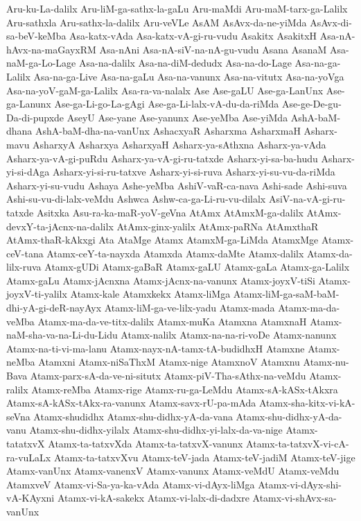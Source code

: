 {Aru-ku-La-dalilx
Aru-liM-ga-sathx-la-gaLu
Aru-maMdi
Aru-maM-tarx-ga-Lalilx
Aru-sathxla
Aru-sathx-la-dalilx
Aru-veVLe
AsAM
AsAvx-da-ne-yiMda
AsAvx-di-sa-beV-keMba
Asa-katx-vAda
Asa-katx-vA-gi-ru-vudu
Asakitx
AsakitxH
Asa-nA-hAvx-na-maGayxRM
Asa-nAni
Asa-nA-siV-na-nA-gu-vudu
Asana
AsanaM
Asa-naM-ga-Lo-Lage
Asa-na-dalilx
Asa-na-diM-dedudx
Asa-na-do-Lage
Asa-na-ga-Lalilx
Asa-na-ga-Live
Asa-na-gaLu
Asa-na-vanunx
Asa-na-vitutx
Asa-na-yoVga
Asa-na-yoV-gaM-ga-Lalilx
Asa-ra-va-nalalx
Ase
Ase-gaLU
Ase-ga-LanUnx
Ase-ga-Lanunx
Ase-ga-Li-go-La-gAgi
Ase-ga-Li-lalx-vA-du-da-riMda
Ase-ge-De-gu-Da-di-pupxde
AseyU
Ase-yane
Ase-yanunx
Ase-yeMba
Ase-yiMda
AshA-baM-dhana
AshA-baM-dha-na-vanUnx
AshacxyaR
Asharxma
AsharxmaH
Asharx-mavu
AsharxyA
Asharxya
AsharxyaH
Asharx-ya-sAthxna
Asharx-ya-vAda
Asharx-ya-vA-gi-puRdu
Asharx-ya-vA-gi-ru-tatxde
Asharx-yi-sa-ba-hudu
Asharx-yi-si-dAga
Asharx-yi-si-ru-tatxve
Asharx-yi-si-ruva
Asharx-yi-su-vu-da-riMda
Asharx-yi-su-vudu
Ashaya
Ashe-yeMba
AshiV-vaR-ca-nava
Ashi-sade
Ashi-suva
Ashi-su-vu-di-lalx-veMdu
Ashwca
Ashw-ca-ga-Li-ru-vu-dilalx
AsiV-na-vA-gi-ru-tatxde
Asitxka
Asu-ra-ka-maR-yoV-geVna
AtAmx
AtAmxM-ga-dalilx
AtAmx-devxY-ta-jAcnx-na-dalilx
AtAmx-ginx-yalilx
AtAmx-paRNa
AtAmxthaR
AtAmx-thaR-kAkxgi
Ata
AtaMge
Atamx
AtamxM-ga-LiMda
AtamxMge
Atamx-ceV-tana
Atamx-ceY-ta-nayxda
Atamxda
Atamx-daMte
Atamx-dalilx
Atamx-da-lilx-ruva
Atamx-gUDi
Atamx-gaBaR
Atamx-gaLU
Atamx-gaLa
Atamx-ga-Lalilx
Atamx-gaLu
Atamx-jAcnxna
Atamx-jAcnx-na-vanunx
Atamx-joyxV-tiSi
Atamx-joyxV-ti-yalilx
Atamx-kale
Atamxkekx
Atamx-liMga
Atamx-liM-ga-saM-baM-dhi-yA-gi-deR-nayAyx
Atamx-liM-ga-ve-lilx-yadu
Atamx-mada
Atamx-ma-da-veMba
Atamx-ma-da-ve-titx-dalilx
Atamx-muKa
Atamxna
AtamxnaH
Atamx-naM-sha-va-na-Li-du-Lidu
Atamx-nalilx
Atamx-na-na-ri-voDe
Atamx-nanunx
Atamx-na-ti-vi-ma-lanu
Atamx-nayx-nA-tamx-tA-budidhxH
Atamxne
Atamx-neMba
Atamxni
Atamx-niSaThxM
Atamx-nige
AtamxnoV
Atamxnu
Atamx-nu-Bava
Atamx-parx-sA-da-ve-ni-situtx
Atamx-piV-Tha-sAthx-na-veMdu
Atamx-ralilx
Atamx-reMba
Atamx-rige
Atamx-ru-ga-LeMdu
Atamx-sA-kASx-tAkxra
Atamx-sA-kASx-tAkx-ra-vanunx
Atamx-savx-rU-pa-mAda
Atamx-sha-kitx-vi-kA-seVna
Atamx-shudidhx
Atamx-shu-didhx-yA-da-vana
Atamx-shu-didhx-yA-da-vanu
Atamx-shu-didhx-yilalx
Atamx-shu-didhx-yi-lalx-da-va-nige
Atamx-tatatxvX
Atamx-ta-tatxvXda
Atamx-ta-tatxvX-vanunx
Atamx-ta-tatxvX-vi-cA-ra-vuLaLx
Atamx-ta-tatxvXvu
Atamx-teV-jada
Atamx-teV-jadiM
Atamx-teV-jige
Atamx-vanUnx
Atamx-vanenxV
Atamx-vanunx
Atamx-veMdU
Atamx-veMdu
AtamxveV
Atamx-vi-Sa-ya-ka-vAda
Atamx-vi-dAyx-liMga
Atamx-vi-dAyx-shi-vA-KAyxni
Atamx-vi-kA-sakekx
Atamx-vi-lalx-di-dadxre
Atamx-vi-shAvx-sa-vanUnx
}
